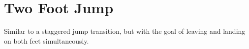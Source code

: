 \section{Two Foot Jump}
\label{sec:transitions/jump_staggered}

Similar to a staggered jump transition, but with the goal of leaving and landing on both feet simultaneously.  


